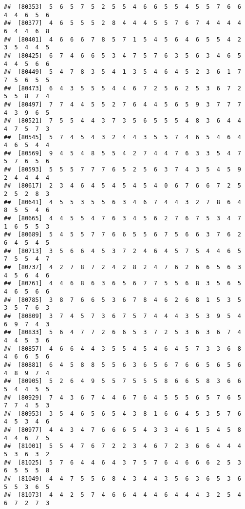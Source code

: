 \documentclass[
]{book}
\begin{document}
\begin{verbatim}
##  [80353]  5  6  5  7  5  2  5  5  4  6  6  5  5  4  5  5  7  6  6  4  4  6  5  6
##  [80377]  4  6  5  5  5  2  8  4  4  4  5  5  7  6  7  4  4  4  4  6  4  4  6  8
##  [80401]  4  6  6  6  7  8  5  7  1  5  4  5  6  4  6  5  5  4  2  3  5  4  4  5
##  [80425]  6  7  4  6  6  5  3  4  7  5  7  6  3  5  6  3  4  6  5  4  4  5  6  6
##  [80449]  5  4  7  8  3  5  4  1  3  5  4  6  4  5  2  3  6  1  7  7  5  6  5  5
##  [80473]  6  4  3  5  5  5  4  4  6  7  2  5  6  2  5  3  6  7  2  5  5  8  7  4
##  [80497]  7  7  4  4  5  5  2  7  6  4  4  5  6  5  9  3  7  7  7  4  3  9  6  5
##  [80521]  7  5  5  4  4  3  7  3  5  6  5  5  5  4  8  3  6  4  4  4  7  5  7  3
##  [80545]  5  7  4  5  4  3  2  4  4  3  5  5  7  4  6  5  4  6  4  4  6  5  4  4
##  [80569]  9  4  5  4  8  5  5  4  2  7  4  4  7  6  3  3  5  4  7  5  7  6  5  6
##  [80593]  5  5  5  7  7  7  6  5  2  5  6  3  7  4  3  5  4  5  9  2  4  4  4  4
##  [80617]  2  3  4  6  4  5  4  5  4  5  4  0  6  7  6  6  7  2  5  2  5  2  8  3
##  [80641]  4  5  5  3  5  5  6  3  4  6  7  4  4  3  2  7  8  6  4  8  5  5  4  6
##  [80665]  4  4  5  5  4  7  6  3  4  5  6  2  7  6  7  5  3  4  7  1  6  5  5  3
##  [80689]  5  4  5  5  7  7  6  6  5  5  6  7  5  6  6  3  7  6  2  6  4  5  4  5
##  [80713]  3  5  6  6  4  5  3  7  2  4  6  4  5  7  5  4  4  6  5  7  5  5  4  7
##  [80737]  4  2  7  8  7  2  4  2  8  2  4  7  6  2  6  6  5  6  3  4  5  6  4  6
##  [80761]  4  4  6  8  6  3  6  5  6  7  7  5  5  6  8  3  5  6  5  4  6  5  6  6
##  [80785]  3  8  7  6  6  5  3  6  7  8  4  6  2  6  8  1  5  3  5  3  5  7  6  3
##  [80809]  3  7  4  5  7  3  6  7  5  7  4  4  4  3  5  3  9  5  4  6  9  7  4  3
##  [80833]  5  6  4  7  7  2  6  6  5  3  7  2  5  3  6  3  6  7  4  4  4  5  3  6
##  [80857]  4  6  6  4  4  3  5  5  4  5  4  6  4  5  7  3  3  6  8  4  6  6  5  6
##  [80881]  6  4  5  8  8  5  5  6  3  6  5  6  7  6  6  5  6  5  6  4  8  9  7  4
##  [80905]  5  2  6  4  9  5  5  7  5  5  5  8  6  6  5  8  3  6  6  5  4  4  5  5
##  [80929]  7  4  3  6  7  4  4  6  7  6  4  5  5  5  6  5  7  6  5  7  7  4  5  3
##  [80953]  3  5  4  6  5  6  5  4  3  8  1  6  6  4  5  3  5  7  6  4  5  3  4  6
##  [80977]  4  4  3  4  7  6  6  6  5  4  3  3  4  6  1  5  4  5  8  4  4  6  7  5
##  [81001]  5  5  4  7  6  7  2  2  3  4  6  7  2  3  6  6  4  4  4  5  3  6  3  2
##  [81025]  5  7  6  4  4  6  4  3  7  5  7  6  4  6  6  6  2  5  3  6  5  5  5  8
##  [81049]  4  4  7  5  5  6  8  4  3  4  4  3  5  6  3  6  5  3  6  5  5  3  6  5
##  [81073]  4  4  2  5  7  4  6  6  4  4  4  6  4  4  4  3  2  5  4  6  7  2  7  3

\end{verbatim}
\end{document}
